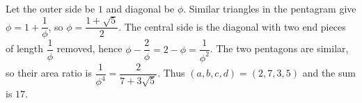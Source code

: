 Let the outer side be $1$ and diagonal be $\phi$. Similar triangles in the pentagram give $\phi=1+\dfrac{1}{\phi}$, so $\phi=\dfrac{1+\sqrt5}{2}$. The central side is the diagonal with two end pieces of length $\dfrac{1}{\phi}$ removed, hence $\phi-\dfrac{2}{\phi}=2-\phi=\dfrac{1}{\phi^2}$. The two pentagons are similar, so their area ratio is $\dfrac{1}{\phi^4}=\dfrac{2}{7+3\sqrt5}$. Thus $(a,b,c,d)=(2,7,3,5)$ and the sum is $\boxed{17}$.
